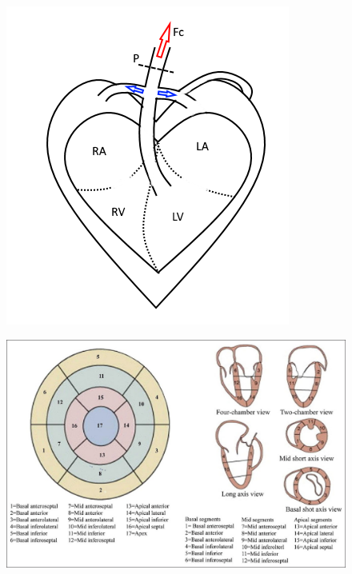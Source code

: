 
\begin{figure}
\centering
\begin{minipage}{.5\textwidth}
  \centering
  \includegraphics[width=0.7\linewidth]{./images/simplified_heart.png}
  \label{fig:sim_heart}
\end{minipage}%
\begin{minipage}{.5\textwidth}
  \centering
  \includegraphics[width=0.95\linewidth]{./images/17_segment.jpg}
  \label{fig:segment_heart}
\end{minipage}
\end{figure}

